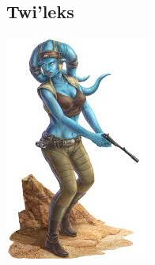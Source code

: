 \documentclass[twoside]{article}
\begin{document}
\subsection*{Twi'leks}

\noindent\begin{minipage}{0.3\textwidth}
	\includegraphics[width=1\linewidth]{../img/species/twilek}
\end{minipage}%
\hfill%
\end{document}
